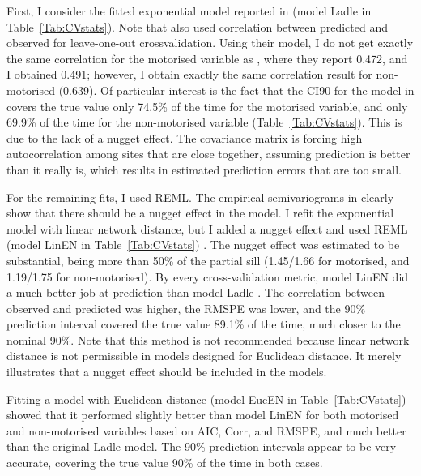 \documentclass[11pt, titlepage]{article}\usepackage[]{graphicx}\usepackage[]{color}
\begin{document}
\begin{spacing}{1.9}
\begin{flushleft}
First, I consider the fitted exponential model reported in \citet{Ladl:Avga:Whea:Boyc:pred:2016} (model Ladle in Table~\ref{Tab:CVstats}). Note that \citet{Ladl:Avga:Whea:Boyc:pred:2016} also used correlation between predicted and observed for leave-one-out crossvalidation. Using their model, I do not get exactly the same correlation for the motorised variable as \citet{Ladl:Avga:Whea:Boyc:pred:2016}, where they report 0.472, and I obtained 0.491; however, I obtain exactly the same correlation result for non-motorised (0.639).  Of particular interest is the fact that the CI90 for the model in \citet{Ladl:Avga:Whea:Boyc:pred:2016} covers the true value only 74.5\% of the time for the motorised variable, and only 69.9\% of the time for the non-motorised variable (Table~\ref{Tab:CVstats}). This is due to the lack of a nugget effect. The covariance matrix is forcing high autocorrelation among sites that are close together, assuming prediction is better than it really is, which results in estimated prediction errors that are too small. 

 For the remaining fits, I used REML. The empirical semivariograms in \citet{Ladl:Avga:Whea:Boyc:pred:2016} clearly show that there should be a nugget effect in the model. I refit the exponential model with linear network distance, but I added a nugget effect and used REML (model LinEN in Table~\ref{Tab:CVstats}) .  The nugget effect was estimated to be substantial, being more than 50\% of the partial sill (1.45/1.66 for motorised, and 1.19/1.75 for non-motorised). By every cross-validation metric, model LinEN did a much better job at prediction than model Ladle  \citep{Ladl:Avga:Whea:Boyc:pred:2016}.  The correlation between observed and predicted was higher, the RMSPE was lower, and the 90\% prediction interval covered the true value 89.1\% of the time, much closer to the nominal 90\%. Note that this method is not recommended because linear network distance is not permissible in models designed for Euclidean distance. It merely illustrates that a nugget effect should be included in the models.

Fitting a model with Euclidean distance (model EucEN in Table~\ref{Tab:CVstats}) showed that it performed slightly better than model LinEN for both motorised and non-motorised variables based on AIC, Corr, and RMSPE, and much better than the original Ladle model. The 90\% prediction intervals appear to be very accurate, covering the true value 90\% of the time in both cases.


\end{flushleft}
\end{spacing}
\end{document}
